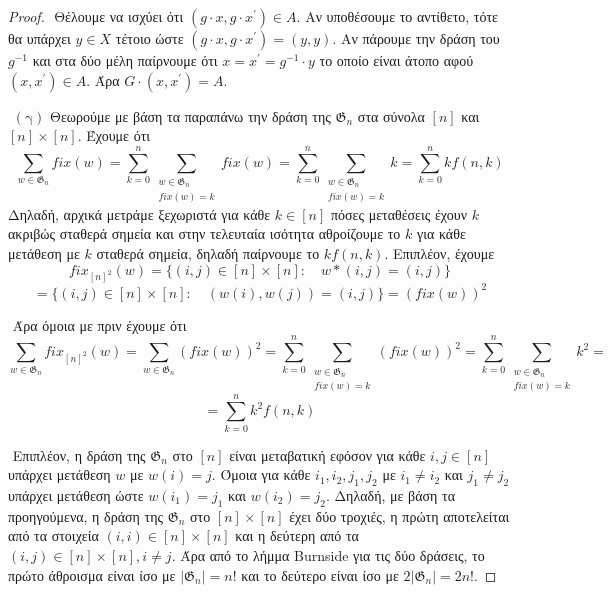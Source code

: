 \documentclass[oneside,a4paper]{article}
\newcommand {\tl}{\textlatin}
\begin{document}
\begin{proof}
	$ $\newline
	Θέλουμε να ισχύει ότι $(g\cdot x, g \cdot x^{\prime}) \in A$. Αν υποθέσουμε το αντίθετο, τότε θα υπάρχει $y \in X$ τέτοιο ώστε $(g\cdot x, g \cdot x^{\prime}) = (y,y)$. Αν πάρουμε την δράση του $g^{-1}$ και στα δύο μέλη παίρνουμε ότι $x = x^{\prime} = g^{-1}\cdot y$ το οποίο είναι άτοπο αφού $(x,x^{\prime}) \in A$. Άρα $G\cdot (x,x^{\prime}) = A$.

	\vspace*{0.1cm}
	$ $\newline
	$(\text{γ})$ Θεωρούμε με βάση τα παραπάνω την δράση της $\mathfrak{G}_n$ στα σύνολα $[n]$ και $[n]\times [n]$. Έχουμε ότι $$\sum\limits_{w \in \mathfrak{G}_n} fix(w) = \sum\limits_{k=0}^n \sum\limits_{\substack{w \in \mathfrak{G}_n \\ fix(w) = k}} fix(w) = \sum\limits_{k=0}^n \sum\limits_{\substack{w \in \mathfrak{G}_n \\ fix(w) = k}} k = \sum\limits_{k=0}^n k f(n,k)$$ Δηλαδή, αρχικά μετράμε ξεχωριστά για κάθε $k \in [n]$ πόσες μεταθέσεις έχουν $k$ ακριβώς σταθερά σημεία και στην τελευταία ισότητα αθροίζουμε το $k$ για κάθε μετάθεση με $k$ σταθερά σημεία, δηλαδή παίρνουμε το $k f(n,k)$. Επιπλέον, έχουμε $$fix_{[n]^2} (w) = \{(i,j) \in [n]\times [n]: \quad w*(i,j) = (i,j)\} $$
	$$= \{(i,j) \in [n]\times [n]: \quad (w(i),w(j)) = (i,j)\} = (fix(w))^2$$

	$ $\newline
	Άρα όμοια με πριν έχουμε ότι $$\sum\limits_{w \in \mathfrak{G}_n} fix_{[n]^2}(w) = \sum\limits_{w \in \mathfrak{G}_n} (fix(w))^2 = \sum\limits_{k=0}^n \sum\limits_{\substack{w \in \mathfrak{G}_n \\ fix(w) = k}} (fix(w))^2 = \sum\limits_{k=0}^n \sum\limits_{\substack{w \in \mathfrak{G}_n \\ fix(w) = k}} k^2 = $$ $$=  \sum\limits_{k=0}^n k^2 f(n,k)$$
	
	
	
	$ $\newline
	Επιπλέον, η δράση της $\mathfrak{G}_n$ στο $[n]$ είναι μεταβατική εφόσον για κάθε $i,j \in [n]$ υπάρχει μετάθεση $w$ με $w(i)=j$. Όμοια για κάθε $i_1,i_2,j_1,j_2$ με $i_1 \neq i_2$ και $ j_1 \neq j_2$ υπάρχει μετάθεση ώστε $w(i_1) = j_1$ και $w(i_2) = j_2$. Δηλαδή, με βάση τα προηγούμενα, η δράση της $\mathfrak{G}_n$ στο $[n]\times [n]$ έχει δύο τροχιές, η πρώτη αποτελείται από τα στοιχεία $(i,i) \in [n]\times[n]$ και η δεύτερη από τα $(i,j) \in [n]\times[n], i\neq j$. Άρα από το λήμμα \tl{Burnside} για τις δύο δράσεις, το πρώτο άθροισμα είναι ίσο με $|\mathfrak{G}_n|= n!$ και το δεύτερο είναι ίσο με $2|\mathfrak{G}_n| = 2n!$.

\end{proof}
\pagebreak
\end{document}
